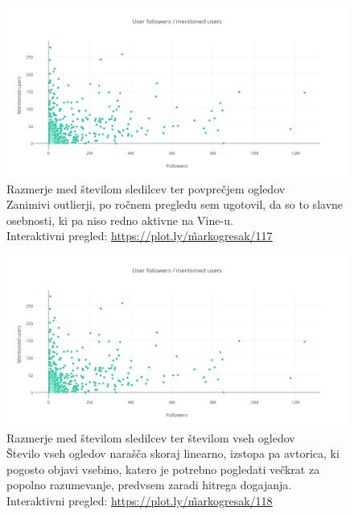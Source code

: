 \documentclass[a4paper,11pt]{article}
\begin{document}
\begin{figure}[htbp]
  \begin{center}
    \includegraphics[width=\textwidth,height=\textheight,keepaspectratio]{figures/follower-cooperations.png}
    \caption{Razmerje med številom sledilcev ter povprečjem ogledov\\
    Zanimivi outlierji, po ročnem pregledu sem ugotovil, da so to slavne osebnosti, ki pa niso redno aktivne na Vine-u. \\
    Interaktivni pregled: \href{https://plot.ly/\~markogresak/117}{\underline{https://plot.ly/\~markogresak/117}}}
  \end{center}
\end{figure}

\begin{figure}[htbp]
  \begin{center}
    \includegraphics[width=\textwidth,height=\textheight,keepaspectratio]{figures/follower-cooperations.png}
    \caption{Razmerje med številom sledilcev ter številom vseh ogledov\\
    Število vseh ogledov narašča skoraj linearno, izstopa pa avtorica, ki pogosto objavi vsebino, katero je potrebno pogledati večkrat za popolno razumevanje, predvsem zaradi hitrega dogajanja. \\
    Interaktivni pregled: \href{https://plot.ly/\~markogresak/118}{\underline{https://plot.ly/\~markogresak/118}}}
  \end{center}
\end{figure}
\end{document}
